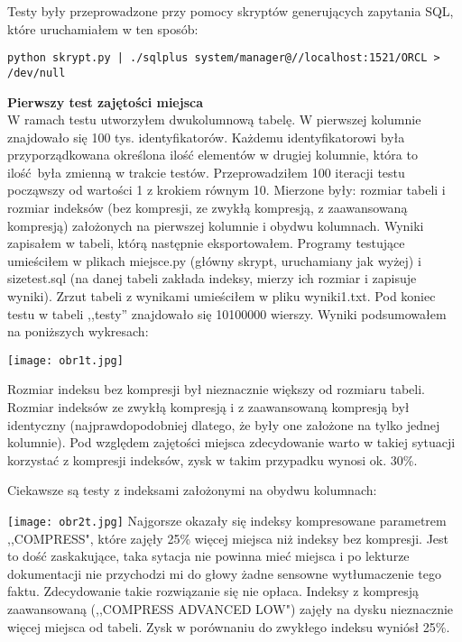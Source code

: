 \documentclass[a4paper,11pt]{article}
\begin{document}
Testy były przeprowadzone przy pomocy skryptów generujących zapytania SQL, które uruchamiałem w ten sposób:

\begin{verbatim}
python skrypt.py | ./sqlplus system/manager@//localhost:1521/ORCL > /dev/null
\end{verbatim}

{\bf Pierwszy test zajętości miejsca} \\

W ramach testu utworzyłem dwukolumnową tabelę. W pierwszej kolumnie znajdowało się
100 tys. identyfikatorów. Każdemu identyfikatorowi była przyporządkowana określona ilość elementów w drugiej kolumnie,
która to ilość była zmienną w trakcie testów. Przeprowadziłem 100 iteracji testu począwszy od wartości 1 z krokiem
równym 10. Mierzone były: rozmiar tabeli i rozmiar indeksów (bez kompresji, ze zwykłą kompresją, z zaawansowaną
kompresją) założonych na pierwszej kolumnie i obydwu kolumnach. Wyniki zapisałem w tabeli, którą następnie eksportowałem. 
Programy testujące umieściłem w plikach miejsce.py (główny skrypt, uruchamiany jak wyżej) i sizetest.sql (na danej tabeli zakłada indeksy, mierzy ich rozmiar i zapisuje wyniki). Zrzut tabeli z wynikami 
umieściłem w pliku wyniki1.txt. Pod koniec testu w tabeli ,,testy'' znajdowało się 10100000 wierszy. Wyniki podsumowałem
na poniższych wykresach:

\texttt{[image: obr1t.jpg]}

Rozmiar indeksu bez kompresji był nieznacznie większy od rozmiaru tabeli. Rozmiar indeksów ze zwykłą kompresją i z
zaawansowaną kompresją był identyczny (najprawdopodobniej dlatego, że były one założone na tylko jednej kolumnie).
Pod względem zajętości miejsca zdecydowanie warto w takiej sytuacji korzystać z kompresji indeksów, zysk w takim
przypadku wynosi ok. 30\%.

Ciekawsze są testy z indeksami założonymi na obydwu kolumnach:

\texttt{[image: obr2t.jpg]}
Najgorsze okazały się indeksy kompresowane parametrem ,,COMPRESS", które zajęły 25\% więcej miejsca niż
indeksy bez kompresji. Jest to dość zaskakujące, taka sytacja nie powinna mieć miejsca i po lekturze dokumentacji nie przychodzi mi do głowy żadne sensowne wytłumaczenie tego faktu. Zdecydowanie takie rozwiązanie się nie opłaca.
Indeksy z kompresją zaawansowaną (,,COMPRESS ADVANCED LOW") zajęły na dysku nieznacznie więcej miejsca od tabeli. Zysk w porównaniu do zwykłego indeksu wyniósł 25\%. \\
\end{document}
